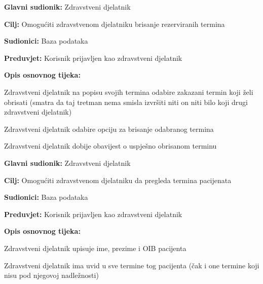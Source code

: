 \noindent {}
\begin{packed_item}
	
	\item \textbf{Glavni sudionik: }Zdravstveni djelatnik
	\item  \textbf{Cilj:} Omogućiti zdravstvenom djelatniku brisanje rezerviranih termina
	\item  \textbf{Sudionici:} Baza podataka
	\item  \textbf{Preduvjet:} Korisnik prijavljen kao zdravstveni djelatnik
	\item  \textbf{Opis osnovnog tijeka:}
	
	\item[] \begin{packed_enum}
		
		\item Zdravstveni djelatnik na popisu svojih termina odabire zakazani termin koji želi obrisati (smatra da taj tretman nema smisla izvršiti niti on niti bilo koji drugi zdravstveni djelatnik)
		\item Zdravstveni djelatnik odabire opciju za brisanje odabranog termina
		\item Zdravstveni djelatnik dobije obavijest o uspješno obrisanom terminu
	\end{packed_enum}
	
		
	\end{packed_item}
	

\noindent {}
\begin{packed_item}
	
	\item \textbf{Glavni sudionik: }Zdravstveni djelatnik
	\item  \textbf{Cilj:} Omogućiti zdravstvenom djelatniku da pregleda termina pacijenata
	\item  \textbf{Sudionici:} Baza podataka
	\item  \textbf{Preduvjet:} Korisnik prijavljen kao zdravstveni djelatnik
	\item  \textbf{Opis osnovnog tijeka:}
	
	\item[] \begin{packed_enum}
		
		\item Zdravstveni djelatnik upisuje ime, prezime i OIB pacijenta
		\item Zdravstveni djelatnik ima uvid u sve termine tog pacijenta (čak i one termine koji nisu pod njegovoj nadležnosti)
	\end{packed_enum}
	
\end{packed_item}

